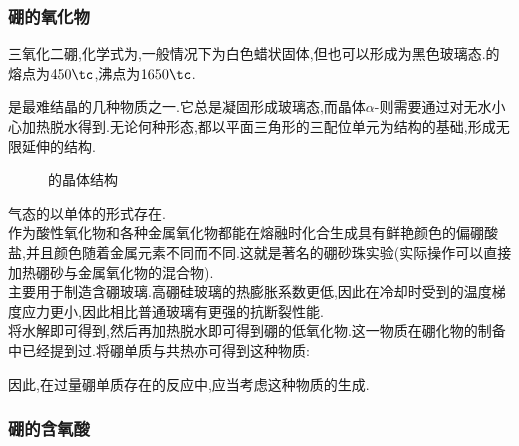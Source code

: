 \documentclass{ctexart}
\begin{document}
\subsubsection{硼的氧化物}
\begin{substance}[\ce{B2O3}]
    三氧化二硼,化学式为,一般情况下为白色蜡状固体,但也可以形成为黑色玻璃态.的熔点为$450\tc$,沸点为$1650\tc$.
\end{substance}
是最难结晶的几种物质之一.它总是凝固形成玻璃态,而晶体$\alpha$-则需要通过对无水小心加热脱水得到.无论何种形态,都以平面三角形的三配位单元为结构的基础,形成无限延伸的结构.
\begin{figure}[H]
    \caption{的晶体结构}
\end{figure}
气态的以单体的形式存在.\\
\indent {}作为酸性氧化物和各种金属氧化物都能在熔融时化合生成具有鲜艳颜色的偏硼酸盐,并且颜色随着金属元素不同而不同.这就是著名的硼砂珠实验(实际操作可以直接加热硼砂与金属氧化物的混合物).\\
\indent {}主要用于制造含硼玻璃.高硼硅玻璃的热膨胀系数更低,因此在冷却时受到的温度梯度应力更小,因此相比普通玻璃有更强的抗断裂性能.\\
\indent 将水解即可得到,然后再加热脱水即可得到硼的低氧化物.这一物质在硼化物的制备中已经提到过.将硼单质与共热亦可得到这种物质:
\begin{center}
\end{center}
因此,在过量硼单质存在的反应中,应当考虑这种物质的生成.
\subsubsection{硼的含氧酸}
\end{document}
